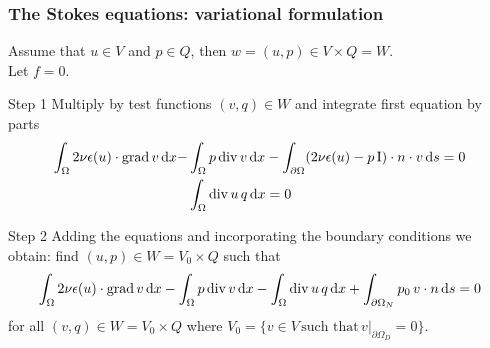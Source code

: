 \begin{frame}[shrink=10]
  \frametitle{The Stokes equations: variational formulation}

  \medskip

  Assume that $u \in V$ and $p \in Q$, then $w = (u, p) \in V \times Q
  = W$. \\
  Let $f = 0$.

  \begin{block}{Step 1}
  Multiply by test functions $(v, q) \in W$ and integrate first
  equation by parts
  \begin{align*}
    \int_{\Omega} 2\nu \epsilon(u) \cdot \operatorname{\mathrm{grad}} v \, \mathrm{d}x
    - &\int_{\Omega} p \operatorname{\mathrm{div}} v \, \mathrm{d}x
    - \int_{\partial \Omega} (2\nu \epsilon(u)
    - p \, \mathrm{I}) \cdot n \cdot v \, \mathrm{d}s
    = 0 \\
    &\int_{\Omega} \operatorname{\mathrm{div}} u \, q \, \mathrm{d}x = 0
  \end{align*}
  \end{block}

  \vspace{-1em}

  \begin{block}{Step 2}
  Adding the equations and incorporating the boundary conditions we
  obtain: find $(u, p) \in W = V_0 \times Q$ such that
  \begin{align*}
    \int_{\Omega} 2\nu \epsilon(u) \cdot \operatorname{\mathrm{grad}} v \, \mathrm{d}x
    - \int_{\Omega} p \operatorname{\mathrm{div}} v \, \mathrm{d}x
    - \int_{\Omega} \operatorname{\mathrm{div}} u \, q \, \mathrm{d}x
    + \int_{\partial \Omega_N} p_0 \, v \cdot n \, \mathrm{d}s = 0
  \end{align*}
  for all $(v, q) \in W = V_0 \times Q$ where $V_0 = \{v \in V \,
  \text{such that} \, v |_{\partial \Omega_D} = 0 \}$.
  \end{block}

\end{frame}
